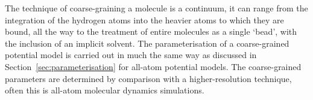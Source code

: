 The technique of coarse-graining a molecule is a continuum, it can range from the integration of the hydrogen atoms into the heavier atoms to which they are bound, all the way to the treatment of entire molecules as a single `bead', with the inclusion of an implicit solvent.
The parameterisation of a coarse-grained potential model is carried out in much the same way as discussed in Section~\ref{sec:parameterisation} for all-atom potential models.
The coarse-grained parameters are determined by comparison with a higher-resolution technique, often this is all-atom molecular dynamics simulations.
